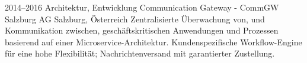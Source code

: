 \cventry
{2014--2016}
{Architektur, Entwicklung}
{Communication Gateway - CommGW}
{Salzburg AG}
{Salzburg, Österreich}
{
  Zentralisierte Überwachung von, und Kommunikation zwischen, geschäftskritischen
  Anwendungen und Prozessen basierend auf einer Microservice-Architektur.
  Kundenspezifische Workflow-Engine für eine hohe Flexibilität; Nachrichtenversand
  mit garantierter Zustellung.
}
